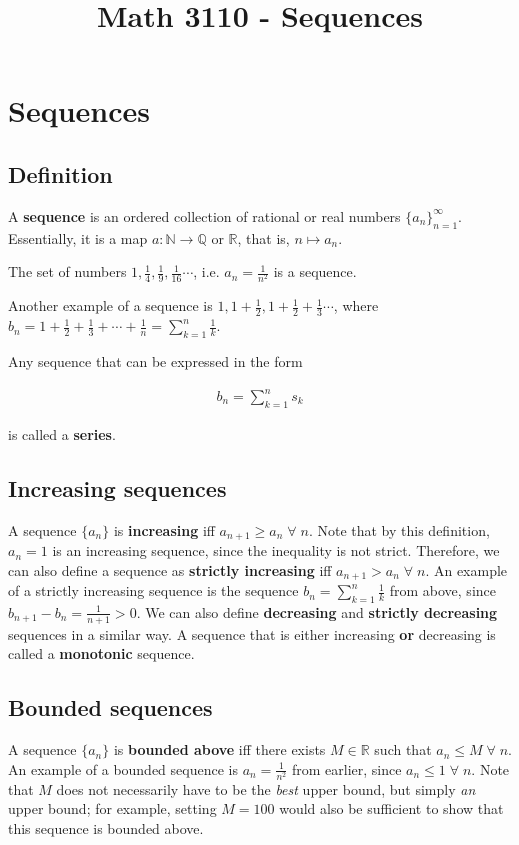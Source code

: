 

\title{Math 3110 - Sequences}
\author{\name}
\maketitle

\section{Sequences}

\subsection{Definition}
A \textbf{sequence} is an ordered collection of rational or real numbers $\{a_n\}_{n = 1}^{\infty}$. Essentially, it is a map $a: \mathbb{N} \rightarrow \mathbb{Q}$ or $\mathbb{R}$, that is, $n \mapsto a_n$.

\ex
The set of numbers $1, \frac{1}{4}, \frac{1}{9}, \frac{1}{16} \cdots$, i.e. $a_n = \frac{1}{n^2}$ is a sequence.

\ex
Another example of a sequence is $1, 1 + \frac{1}{2}, 1 + \frac{1}{2} + \frac{1}{3} \cdots$, where $b_n = 1 + \frac{1}{2} + \frac{1}{3} + \cdots + \frac{1}{n} = \sum_{k = 1}^n \frac{1}{k}$.

Any sequence that can be expressed in the form

\begin{align*}
  b_n = \sum_{k = 1}^n s_k
\end{align*}

is called a \textbf{series}.

\subsection{Increasing sequences}
A sequence $\{a_n\}$ is \textbf{increasing} iff $a_{n + 1} \geq a_n \;\forall\; n$. Note that by this definition, $a_n = 1$ is an increasing sequence, since the inequality is not strict. Therefore, we can also define a sequence as \textbf{strictly increasing} iff $a_{n + 1} > a_n \;\forall\; n$. An example of a strictly increasing sequence is the sequence $b_n = \sum_{k = 1}^n \frac{1}{k}$ from above, since $b_{n + 1} - b_n = \frac{1}{n + 1} > 0$. We can also define \textbf{decreasing} and \textbf{strictly decreasing} sequences in a similar way. A sequence that is either increasing \textbf{or} decreasing is called a \textbf{monotonic} sequence.

\subsection{Bounded sequences}
A sequence $\{a_n\}$ is \textbf{bounded above} iff there exists $M \in \mathbb{R}$ such that $a_n \leq M \;\forall\; n$. An example of a bounded sequence is $a_n = \frac{1}{n^2}$ from earlier, since $a_n \leq 1 \;\forall\; n$. Note that $M$ does not necessarily have to be the \textit{best} upper bound, but simply \textit{an} upper bound; for example, setting $M = 100$ would also be sufficient to show that this sequence is bounded above.

